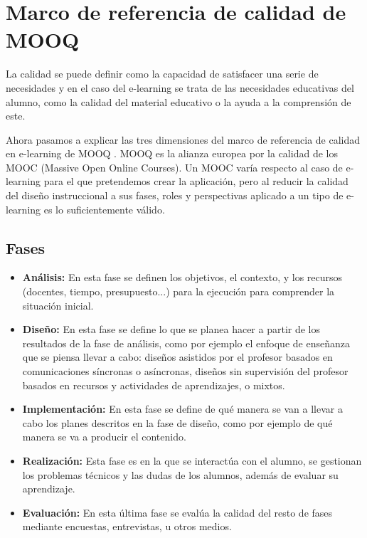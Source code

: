 \section{Marco de referencia de calidad de MOOQ}
La calidad se puede definir como la capacidad de satisfacer una serie de necesidades y en el caso del e-learning se trata de las necesidades educativas del alumno, como la calidad del material educativo o la ayuda a la comprensión de este.

Ahora pasamos a explicar las tres dimensiones del marco de referencia de calidad en e-learning de MOOQ \cite{stracke2018quality}. MOOQ es la alianza europea por la calidad de los MOOC (Massive Open Online Courses). Un MOOC varía respecto al caso de e-learning para el que pretendemos crear la aplicación, pero al reducir la calidad del diseño instruccional a sus fases, roles y perspectivas aplicado a un tipo de e-learning es lo suficientemente válido.
\subsection{Fases}
\begin{itemize}
	\item \textbf{Análisis:}
	En esta fase se definen los objetivos, el contexto, y los recursos (docentes, tiempo, presupuesto...) para la ejecución para comprender la situación inicial.
	\item \textbf{Diseño:}
	En esta fase se define lo que se planea hacer a partir de los resultados de la fase de análisis, como por ejemplo el enfoque de enseñanza que se piensa llevar a cabo: diseños asistidos por el profesor basados en comunicaciones síncronas o asíncronas, diseños sin supervisión del profesor basados en recursos y actividades de aprendizajes, o mixtos.
	\item \textbf{Implementación:}
	En esta fase se define de qué manera se van a llevar a cabo los planes descritos en la fase de diseño, como por ejemplo de qué manera se va a producir el contenido.
	\item \textbf{Realización:}
	Esta fase es en la que se interactúa con el alumno, se gestionan los problemas técnicos y las dudas de los alumnos, además de evaluar su aprendizaje.
	\item \textbf{Evaluación:}
	En esta última fase se evalúa la calidad del resto de fases mediante encuestas, entrevistas, u otros medios.
\end{itemize}


